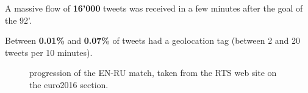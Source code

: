 \documentclass[a4paper,11pt]{report}
\begin{document}
\begin{itemize}
{		\vspace{5pt}
		A massive flow of \textbf{16'000} tweets was received in a few minutes after the goal of the 92'.
		
		\vspace{5pt}
		Between \textbf{0.01\%} and \textbf{0.07\%} of tweets had a geolocation tag (between 2 and 20 tweets per 10 minutes).
	}
	\begin{figure}[H]
	\vspace{-5pt}
	\begin{center}
	\vspace{-5pt}
	\caption{progression of the EN-RU match, taken from the RTS web site on the euro2016 section.}
	\end{center}
	\end{figure}
	\vspace{-20pt}
	\newpage
	

\end{itemize}
\end{document}
